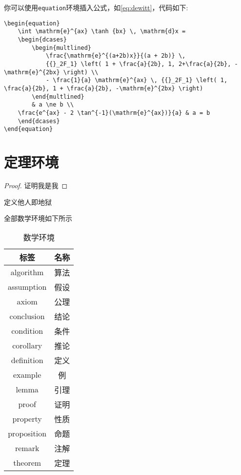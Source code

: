 你可以使用\verb|equation|环境插入公式，如\cref{eq:dewitt}，代码如下:
\begin{lstlisting}
\begin{equation}
    \int \mathrm{e}^{ax} \tanh {bx} \, \mathrm{d}x =
    \begin{dcases}
        \begin{multlined}
            \frac{\mathrm{e}^{(a+2b)x}}{(a + 2b)} \,
            {{}_2F_1} \left( 1 + \frac{a}{2b}, 1, 2+\frac{a}{2b}, -\mathrm{e}^{2bx} \right) \\
            - \frac{1}{a} \mathrm{e}^{ax} \, {{}_2F_1} \left( 1, \frac{a}{2b}, 1 + \frac{a}{2b}, -\mathrm{e}^{2bx} \right)
        \end{multlined}
        & a \ne b \\
    \frac{e^{ax} - 2 \tan^{-1}(\mathrm{e}^{ax})}{a} & a = b
    \end{dcases}
\end{equation}
\end{lstlisting}

\section{定理环境}

\begin{proof}
    证明我是我
\end{proof}

\begin{definition}[他人]
    定义他人即地狱
\end{definition}

全部数学环境如下所示

\begin{table}[htbp]
    \caption{数学环境}
    \label{tab:mathenv}
    \begin{tabular}{cc}
        \toprule
        标签 & 名称 \\
        \midrule
        algorithm & 算法 \\
        assumption & 假设 \\
        axiom & 公理 \\
        conclusion & 结论 \\
        condition & 条件 \\
        corollary & 推论 \\
        definition & 定义 \\
        example & 例 \\ 
        lemma & 引理 \\
        proof & 证明 \\
        property & 性质 \\
        proposition & 命题 \\
        remark & 注解 \\
        theorem & 定理 \\
        \bottomrule
    \end{tabular}
\end{table}
